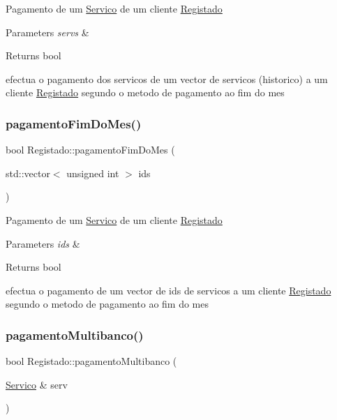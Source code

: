 Pagamento de um \hyperlink{class_servico}{Servico} de um cliente \hyperlink{class_registado}{Registado}


\begin{DoxyParams}{Parameters}
{\em servs} & \\
\hline
\end{DoxyParams}
\begin{DoxyReturn}{Returns}
bool
\end{DoxyReturn}
efectua o pagamento dos servicos de um vector de servicos (historico) a um cliente \hyperlink{class_registado}{Registado} segundo o metodo de pagamento ao fim do mes \mbox{\label{class_registado_a0ee7364d85601f95bfe6bf45c062ec06}} 
\subsubsection{\texorpdfstring{pagamento\+Fim\+Do\+Mes()}{pagamentoFimDoMes()}\hspace{0.1cm}{\footnotesize\ttfamily [2/2]}}
{\footnotesize\ttfamily bool Registado\+::pagamento\+Fim\+Do\+Mes (\begin{DoxyParamCaption}\item[{std\+::vector$<$ unsigned int $>$}]{ids }\end{DoxyParamCaption})\hspace{0.3cm}{\ttfamily [virtual]}}

Pagamento de um \hyperlink{class_servico}{Servico} de um cliente \hyperlink{class_registado}{Registado}


\begin{DoxyParams}{Parameters}
{\em ids} & \\
\hline
\end{DoxyParams}
\begin{DoxyReturn}{Returns}
bool
\end{DoxyReturn}
efectua o pagamento de um vector de ids de servicos a um cliente \hyperlink{class_registado}{Registado} segundo o metodo de pagamento ao fim do mes \mbox{\label{class_registado_a36be4ccf8e4b1bc26be7c1c2d4612229}} 
\subsubsection{\texorpdfstring{pagamento\+Multibanco()}{pagamentoMultibanco()}\hspace{0.1cm}{\footnotesize\ttfamily [1/2]}}
{\footnotesize\ttfamily bool Registado\+::pagamento\+Multibanco (\begin{DoxyParamCaption}\item[{\hyperlink{class_servico}{Servico} \&}]{serv }\end{DoxyParamCaption})\hspace{0.3cm}{\ttfamily [virtual]}}

